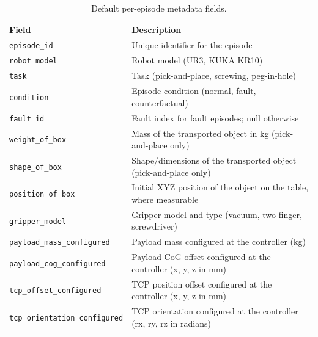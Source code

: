 \documentclass{article}
\begin{document}
\begin{table}[htbp]
    \centering
    \caption{Default per-episode metadata fields.}
    \label{tab:metadata}
    \small
    \begin{tabular}{lp{9.5cm}}
        \toprule
        Field                                 & Description                                                          \\
        \midrule
        \texttt{episode\_id}                  & Unique identifier for the episode                                    \\
        \texttt{robot\_model}                 & Robot model (UR3, KUKA KR10)                                         \\
        \texttt{task}                         & Task (pick-and-place, screwing, peg-in-hole)                         \\
        \texttt{condition}                    & Episode condition (normal, fault, counterfactual)                    \\
        \texttt{fault\_id}                    & Fault index for fault episodes; null otherwise                       \\
        \texttt{weight\_of\_box}              & Mass of the transported object in kg (pick-and-place only)           \\
        \texttt{shape\_of\_box}               & Shape/dimensions of the transported object (pick-and-place only)     \\
        \texttt{position\_of\_box}            & Initial XYZ position of the object on the table, where measurable    \\
        \texttt{gripper\_model}               & Gripper model and type (vacuum, two-finger, screwdriver)             \\
        \texttt{payload\_mass\_configured}    & Payload mass configured at the controller (kg)                       \\
        \texttt{payload\_cog\_configured}     & Payload CoG offset configured at the controller (x, y, z in mm)      \\
        \texttt{tcp\_offset\_configured}      & TCP position offset configured at the controller (x, y, z in mm)     \\
        \texttt{tcp\_orientation\_configured} & TCP orientation configured at the controller (rx, ry, rz in radians) \\
        \bottomrule
    \end{tabular}
\end{table}
\end{document}
